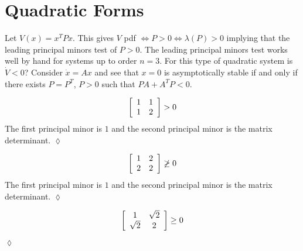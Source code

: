 
\mainmatter%
\setcounter{page}{1}

\lectureseries[\course]{\course}

\date{February 2, 2010}

\setaddress%

\setcounter{lecture}{8}
\setcounter{chapter}{8}


\section{Quadratic Forms}
Let $V(x)=x^T Px$.
This gives $V$ pdf $\Leftrightarrow P>0 \Leftrightarrow \lambda(P)>0$ implying that the leading principal minors test of $P>0$.
The leading principal minors test works well by hand for systems up to order $n=3$.
For this type of quadratic system is $\dot{V}<0$? Consider $\dot{x}=Ax$ and see that $x=0$ is asymptotically stable if and only if there exists $P=P^T$, $P>0$ such that $PA+A^T P<0$.

\begin{example}
\begin{align*}
\left[\begin{array}{c c} 1 & 1 \\ 1 & 2 \end{array}\right]>0
\end{align*}
The first principal minor is $1$ and the second principal minor is the matrix determinant.
$\lozenge$
\end{example}

\begin{example}
\begin{align*}
\left[\begin{array}{c c} 1 & 2 \\ 2 & 2 \end{array}\right]\not\geq0
\end{align*}
The first principal minor is $1$ and the second principal minor is the matrix determinant.
$\lozenge$
\end{example}

\begin{example}
\begin{align*}
\left[\begin{array}{c c} 1 & \sqrt{2} \\ \sqrt{2} & 2 \end{array}\right]\geq0
\end{align*}
$\lozenge$
\end{example}

